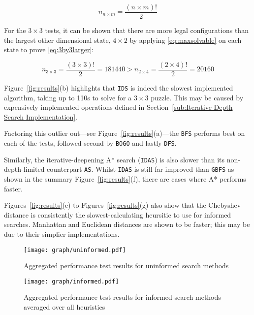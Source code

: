 \begin{equation}\label{eq:maxsolvable}
  n_{n \times m} = \frac{(n \times m)!}{2}
\end{equation}

For the $3 \times 3$ tests, it can be shown that there are more legal configurations
than the largest other dimensional state, $4 \times 2$ by applying \ref{eq:maxsolvable}
on each state to prove \ref{eq:3by3larger}:

\begin{equation}\label{eq:3by3larger}
  n_{3 \times 3} = \frac{( 3 \times 3 )!}{2} = 181440 > n_{2 \times 4} = \frac{( 2 \times 4 )!}{2} = 20160
\end{equation}

Figure~\ref{fig:results}(b) highlights that \texttt{IDS} is indeed the slowest
implemented algorithm, taking up to 110s to solve for a $3 \times 3$ puzzle. This
may be caused by expensively implemented operations defined in
Section~\ref{sub:Iterative Depth Search Implementation}.

Factoring this outlier out---see Figure~\ref{fig:results}(a)---the \texttt{BFS} performs
best on each of the tests, followed second by \texttt{BOGO} and lastly \texttt{DFS}.

Similarly, the iterative-deepening A* search (\texttt{IDAS}) is also slower
than its non-depth-limited counterpart \texttt{AS}. Whilst \texttt{IDAS} is still far
improved than \texttt{GBFS} as shown in the summary Figure~\ref{fig:results}(f),
there are cases where A* performs faster.

Figures~\ref{fig:results}(c) to Figures~\ref{fig:results}(g) also show that the Chebyshev
distance is consistently the slowest-calculating heursitic to use for informed
searches. Manhattan and Euclidean distances are shown to be faster; this may
be due to their simplier implementations.

\begin{figure}[h!]
  \centering
  \texttt{[image: graph/uninformed.pdf]}
  \caption{Aggregated performance test results for uninformed search methods}
  \label{fig:uninformed}
\end{figure}

\begin{figure}[h!]
  \centering
  \texttt{[image: graph/informed.pdf]}
  \caption{Aggregated performance test results for informed search methods averaged over all heuristics}
  \label{fig:informed}
\end{figure}

